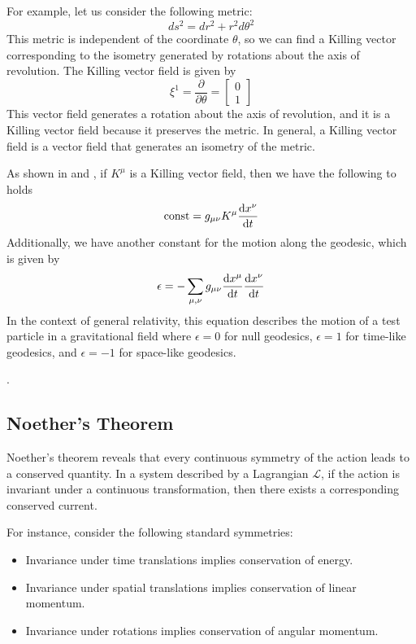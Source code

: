 \documentclass[12pt]{article}
\begin{document}
For example, let us consider the following metric:
\[
	ds^{2} = dr^{2} + r^{2}d\theta^{2} 
\]
This metric is independent of the coordinate \(\theta\), so we can find a Killing vector corresponding to the isometry generated by rotations about the axis of revolution.
The Killing vector field is given by
\[
	\xi^{1} = \frac{\partial}{\partial \theta} = \begin{bmatrix} 0 \\ 1 \end{bmatrix}
\]
This vector field generates a rotation about the axis of revolution, and it is a Killing vector field because it preserves the metric.
In general, a Killing vector field is a vector field that generates an isometry of the metric.


As shown in \cite{carrol2019spacetime} and \cite{atkins2018solving}, if $K^{\mu}$ is a Killing vector field, then we have the following to holds
\begin{equation}\label{eq:Killing_vector}
	\text{const} = g_{\mu\nu}K^{\mu}\dv{x^{\nu}}{t} 
\end{equation}
Additionally, we have another constant for the motion along the geodesic, which is given by
\begin{equation}\label{eq:epsilon_equation}
	\epsilon = - \sum_{\mu,\nu} g_{\mu\nu}\dv{x^{\mu}}{t}\dv{x^{\nu}}{t}
\end{equation}
In the context of general relativity, this equation describes the motion of a test particle in a gravitational field where \(\epsilon = 0\) for null geodesics, \(\epsilon = 1\) for time-like geodesics, and \(\epsilon = -1\) for space-like geodesics.

.
\subsection{Noether's Theorem}
Noether's theorem reveals that every continuous symmetry of the action leads to a conserved quantity. 
In a system described by a Lagrangian \( \mathcal{L} \), if the action is invariant under a continuous transformation, then there exists a corresponding conserved current.

For instance, consider the following standard symmetries:
\begin{itemize}
    \item Invariance under time translations implies conservation of energy.
    \item Invariance under spatial translations implies conservation of linear momentum.
    \item Invariance under rotations implies conservation of angular momentum.
\end{itemize}
\end{document}
